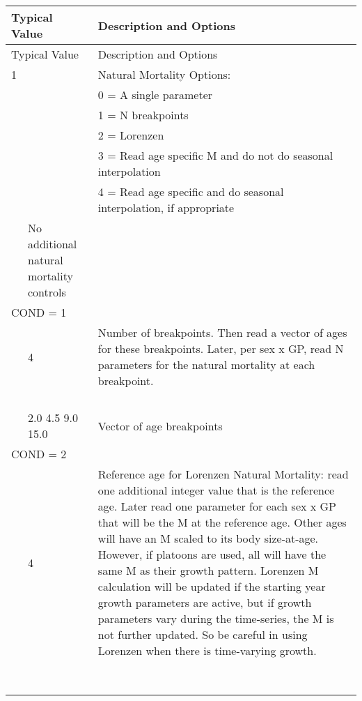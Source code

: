 \begin{longtable}{p{0.5cm} p{2cm} p{12.75cm}}

		\multicolumn{2}{l}{Typical Value} & Description and Options\\
		\hline
		\endfirsthead

		\multicolumn{2}{l}{Typical Value} & Description and Options\\
		\hline
		\endhead

		\endfoot

		\endlastfoot

		1 & & Natural Mortality Options:\\
		  & & 0 = A single parameter\\
		  & & 1 = N breakpoints\\
		  & & 2 = Lorenzen \\
		  & & 3 = Read age specific M and do not do seasonal interpolation\\
		  & & \multirow{1}{12cm}[-0.1cm]{4 = Read age specific and do seasonal interpolation, if appropriate}\\
		\hline
	   \pagebreak
	   \multicolumn{2}{l}{COND = 0} & No additional natural mortality controls \\
		\hline
		\multicolumn{2}{l}{COND = 1} & \\
	   & 4 & \multirow{1}{12cm}[-0.1cm]{Number of breakpoints.  Then read a vector of ages for these breakpoints. Later, per sex x GP, read N parameters for the natural mortality at each breakpoint.}
	   \\
	   \\
	   \\
	   \\
	   \\
	   & 2.0 4.5 9.0 15.0 & Vector of age breakpoints \\
	   \hline
	   
	   \multicolumn{2}{l}{COND = 2}& \\
	   & 4 & \multirow{1}{12cm}[-0.1cm]{Reference age for Lorenzen Natural Mortality: read one additional integer value that is the reference age. Later read one parameter for each sex x GP that will be the M at the reference age.  Other ages will have an M scaled to its body size-at-age.  However, if platoons are used, all will have the same M as their growth pattern.  Lorenzen M calculation will be updated if the starting year growth parameters are active, but if growth parameters vary during the time-series, the M is not further updated.  So be careful in using Lorenzen when there is time-varying growth.}\\
	   \\
	   \\
	   \\
	   \\
	   \\
	   \\
	   \\
	   \\
	   \hline
	   

\end{longtable}
